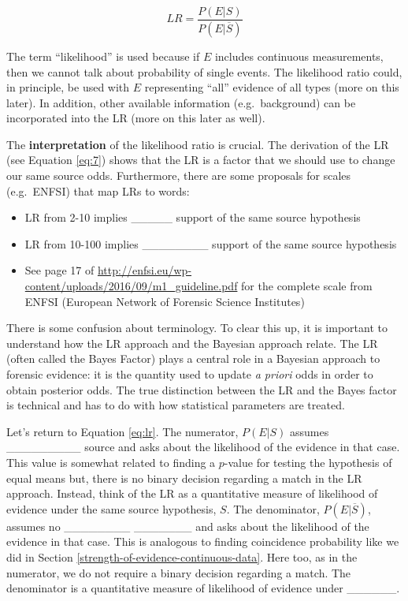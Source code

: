 \documentclass[]{book}
\providecommand{\tightlist}{%
  \setlength{\itemsep}{0pt}\setlength{\parskip}{0pt}}
\theoremstyle{definition}
\theoremstyle{definition}
\theoremstyle{remark}
\begin{document}
\begin{equation}\label{eq:lr}
LR = \frac{P(E|S)}{P(E|\overline{S})}
\end{equation}

The term ``likelihood'' is used because if \(E\) includes continuous
measurements, then we cannot talk about probability of single events.
The likelihood ratio could, in principle, be used with \(E\)
representing ``all'' evidence of all types (more on this later). In
addition, other available information (e.g.~background) can be
incorporated into the LR (more on this later as well).

The \textbf{interpretation} of the likelihood ratio is crucial. The
derivation of the LR (see Equation \ref{eq:7}) shows that the LR is a
factor that we should use to change our same source odds. Furthermore,
there are some proposals for scales (e.g.~ENFSI) that map LRs to words:

\begin{itemize}
\tightlist
\item
  LR from 2-10 implies \_\_\_\_\_ support of the same source
  hypothesis\vspace{.1in}
\item
  LR from 10-100 implies \_\_\_\_\_\_\_\_ support of the same source
  hypothesis\vspace{.1in}
\item
  See page 17 of
  \url{http://enfsi.eu/wp-content/uploads/2016/09/m1_guideline.pdf} for
  the complete scale from ENFSI (European Network of Forensic Science
  Institutes)
\end{itemize}

There is some confusion about terminology. To clear this up, it is
important to understand how the LR approach and the Bayesian approach
relate. The LR (often called the Bayes Factor) plays a central role in a
Bayesian approach to forensic evidence: it is the quantity used to
update \emph{a priori} odds in order to obtain posterior odds. The true
distinction between the LR and the Bayes factor is technical and has to
do with how statistical parameters are treated.

Let's return to Equation \ref{eq:lr}. The numerator, \(P(E|S)\) assumes
\_\_\_\_\_\_\_\_\_ source and asks about the likelihood of the evidence
in that case. This value is somewhat related to finding a \(p\)-value
for testing the hypothesis of equal means but, there is no binary
decision regarding a match in the LR approach. Instead, think of the LR
as a quantitative measure of likelihood of evidence under the same
source hypothesis, \(S\). The denominator, \(P(E|\overline{S})\),
assumes no \_\_\_\_\_\_\_\_ \_\_\_\_\_\_\_ and asks about the likelihood
of the evidence in that case. This is analogous to finding coincidence
probability like we did in Section
\ref{strength-of-evidence-continuous-data}. Here too, as in the
numerator, we do not require a binary decision regarding a match. The
denominator is a quantitative measure of likelihood of evidence under
\_\_\_\_\_\_.
\end{document}
